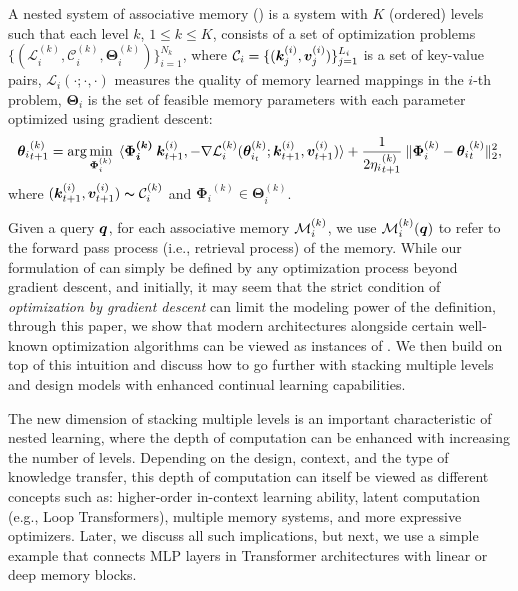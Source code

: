 \begin{dfn} \label{dfn:nsam}
    A nested system of associative memory (\nsam) is a system with $K$ (ordered) levels such that each level $k$, $1 \leq k \leq K$, consists of a set of optimization problems $\{ (\mathcal{L}^{(k)}_{i},  \mathcal{C}^{(k)}_i, \boldsymbol{\Theta}^{(k)}_{i}) \}_{i = 1}^{N_k}$, where $\mathcal{C}_i = \{(\boldsymbol{k}^{(i)}_j, \boldsymbol{v}^{(i)}_j) \}_{j = 1}^{L_{i}}$ is a set of key-value pairs, $\mathcal{L}_{i}(\cdot; \cdot, \cdot)$  measures the quality of memory learned mappings in the $i$-th problem, $\boldsymbol{\Theta}_{i}$ is the set of feasible memory parameters with each parameter optimized using gradient descent:
    \begin{align}
        {\boldsymbol{\theta}_{i}}^{(k)}_{t+1} = \arg\min_{\boldsymbol{\Phi}^{(k)}_{i}} \:\:  \langle \boldsymbol{\Phi_{i}^{(k)}} \: \boldsymbol{k}^{(i)}_{t+1}, - \nabla \mathcal{L}^{(k)}_i(\boldsymbol{\theta}^{(k)}_{i_t}; \boldsymbol{k}^{(i)}_{t+1}, \boldsymbol{v}^{(i)}_{t+1}) \rangle + \frac{1}{2{\eta_{i}}^{(k)}_{t+1}}\:\|\boldsymbol{\Phi}^{(k)}_{i} - {\boldsymbol{\theta}_{i}}^{(k)}_{t} \|^{2}_2,
    \end{align}
    where $(\boldsymbol{k}^{(i)}_{t+1}, \boldsymbol{v}^{(i)}_{t+1}) \thicksim \mathcal{C}^{(k)}_i$ and ${\boldsymbol{\Phi}_{i}}^{(k)} \in  \boldsymbol{\Theta}^{(k)}_{i}$. 
\end{dfn} 

Given a query $\boldsymbol{q}$, for each associative memory $\mathcal{M}_{i}^{(k)}$,
we use $\mathcal{M}_{i}^{(k)}(\boldsymbol{q})$ to refer to the forward pass process (i.e., retrieval process) of the memory. While our formulation of \nsam can simply be defined by any optimization process beyond gradient descent, and initially, it may seem that the strict condition of \emph{optimization by gradient descent} can limit the modeling power of the definition, through this paper, we show that modern architectures alongside certain well-known optimization algorithms can be viewed as instances of \nsam. We then build on top of this intuition and discuss how to go further with stacking multiple levels and design models with enhanced continual learning capabilities. 

The new dimension of stacking multiple levels is an important characteristic of nested learning, where the depth of computation can be enhanced with increasing the number of levels. Depending on the design, context, and the type of knowledge transfer, this depth of computation can itself be viewed as different concepts such as: higher-order in-context learning ability, latent computation (e.g., Loop Transformers), multiple memory systems, and more expressive optimizers. Later, we discuss all such implications, but next, we use a simple example that connects MLP layers in Transformer architectures with linear or deep memory blocks.


